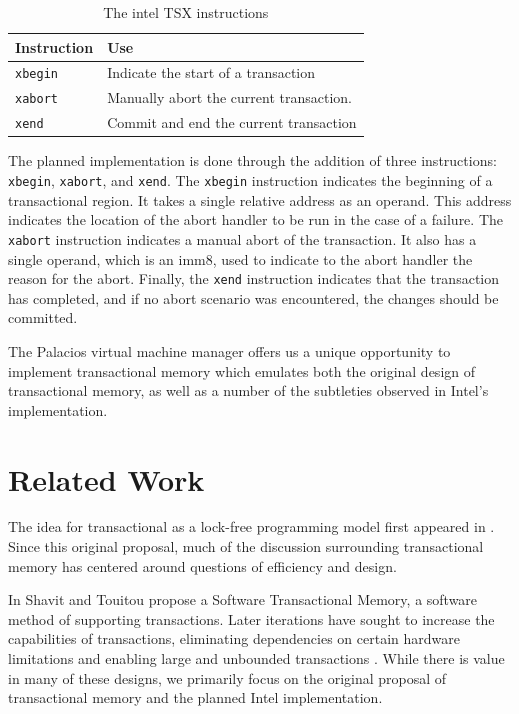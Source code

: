 \documentclass{acm_proc_article-sp}
\begin{document}
\begin{table}
\begin{center}
    \begin{tabular}{| l | l |}
    \hline
    Instruction & Use \\
    \hline
    \texttt{xbegin} & Indicate the start of a transaction \\
    \hline
    \texttt{xabort} & Manually abort the current transaction. \\
    \hline
    \texttt{xend} & Commit and end the current transaction \\
    \hline 
    \end{tabular}
    \caption{The intel TSX instructions}
\label{insttable}
\end{center}
\end{table}


The planned implementation is done through the addition of three instructions:
\texttt{xbegin}, \texttt{xabort}, and \texttt{xend}. The \texttt{xbegin} instruction indicates the beginning of
a transactional region. It takes a single  relative address as an operand. This
address indicates the location of the abort handler to be run in the case of
a failure. The \texttt{xabort} instruction indicates a manual abort of the transaction.
It also has a single operand, which is an imm8, used to indicate to the abort
handler the reason for the abort. Finally, the \texttt{xend} instruction indicates that
the transaction has completed, and if no abort scenario was encountered,
the changes should be committed.

The Palacios virtual machine manager offers us a unique opportunity to
implement transactional memory which emulates both the original design of
transactional memory, as well as a number of the subtleties observed in 
Intel's implementation.

\section{Related Work}

The idea for transactional as a lock-free programming model first appeared in
 \cite{Herlihy:1993:TMA:173682.165164}. Since this original proposal, much of
the discussion surrounding transactional memory has centered around questions 
of efficiency and design.

In \cite{Shavit:1995:STM:224964.224987} Shavit and Touitou propose a Software
Transactional Memory, a software method of supporting transactions. Later 
iterations have sought to increase the capabilities of transactions, 
eliminating dependencies on certain hardware limitations and enabling 
large and unbounded transactions 
\cite{Ananian:2006:UTM:1116644.1116670, Hammond:2004:TMC:1028176.1006711,
Rajwar:2005:VTM:1080695.1070011}. While there is value in many of these 
designs, we primarily focus on the original proposal of transactional memory
and the planned Intel implementation.  
\end{document}
